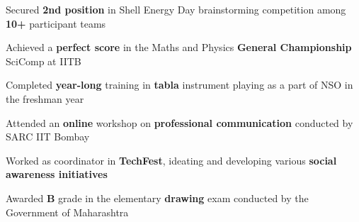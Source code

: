 \documentclass[12pt]{article}
\newcommand{\smallbullet}{
    \small$\bullet$
}
\newenvironment{bullet-list-major}{
    \begin{list}{
        \smallbullet
    }{
        \setlength\leftmargin{15pt}\topsep 0pt \itemsep -4pt
    }
} {
    \end{list}
}
\begin{document}
    \begin{bullet-list-major}
        \item Secured \textbf{2nd position} in Shell Energy Day brainstorming competition among \textbf{10+} participant teams
        \item Achieved a \textbf{perfect score} in the Maths and Physics \textbf{General Championship} SciComp at IITB
        \item Completed \textbf{year-long} training in \textbf{tabla} instrument playing as a part of NSO in the freshman year
        \item Attended an \textbf{online} workshop on \textbf{professional communication} conducted by SARC IIT Bombay
        \item Worked as coordinator in \textbf{TechFest}, ideating and developing various \textbf{social awareness initiatives}
        \item Awarded \textbf{B} grade in the elementary \textbf{drawing} exam conducted by the Government of Maharashtra
    \end{bullet-list-major}


    \vspace*{-7.71mm}
\end{document}
